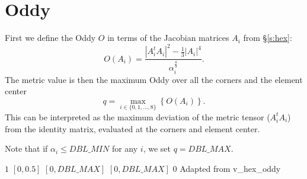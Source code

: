 \section{Oddy}

First we define the Oddy $O$ in terms of the Jacobian matrices $A_i$ from \S\ref{s:hex}:
\[
  O(A_i) = \frac{\left| A_i^t A_i \right|^2 - \frac {1}{3}\left|A_i\right|^4}{\alpha_i^{\frac{4}{3}}}.
\]
The metric value is then the maximum Oddy over all the corners and the element center
\[
  q = \max_{i\in\{0,1,\ldots,8\}}\left\{ O(A_i) \right\}.
\]
This can be interpreted as the maximum deviation of
the metric tensor ($A_i^tA_i$) from the identity matrix, evaluated at the corners and element center.

Note that if $\alpha_i \leq DBL\_MIN$ for any $i$, we set $q = DBL\_MAX$.

%
{$1$}%
{$[0,0.5]$}%
{$[0,DBL\_MAX]$}%
{$[0,DBL\_MAX]$}%
{$0$}%
{Adapted from \cite{odd:88}}%
{v\_hex\_oddy}%
